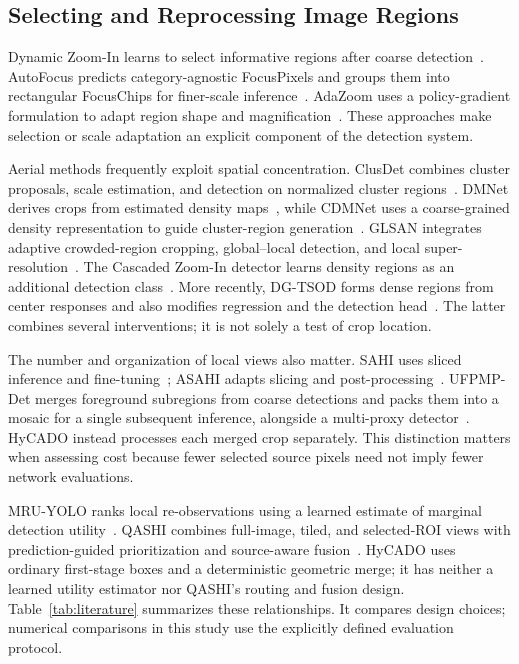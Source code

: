 \documentclass[journal]{IEEEtran}
\begin{document}
\subsection{Selecting and Reprocessing Image Regions}
Dynamic Zoom-In learns to select informative regions after coarse detection~\cite{gao2018dynamic}. AutoFocus predicts category-agnostic FocusPixels and groups them into rectangular FocusChips for finer-scale inference~\cite{najibi2019autofocus}. AdaZoom uses a policy-gradient formulation to adapt region shape and magnification~\cite{xujingtao2021adazoom}. These approaches make selection or scale adaptation an explicit component of the detection system.

Aerial methods frequently exploit spatial concentration. ClusDet combines cluster proposals, scale estimation, and detection on normalized cluster regions~\cite{yang2019clusdet}. DMNet derives crops from estimated density maps~\cite{li2020dmnet}, while CDMNet uses a coarse-grained density representation to guide cluster-region generation~\cite{duan2021cdmnet}. GLSAN integrates adaptive crowded-region cropping, global--local detection, and local super-resolution~\cite{deng2021glsan}. The Cascaded Zoom-In detector learns density regions as an additional detection class~\cite{meethal2023cz}. More recently, DG-TSOD forms dense regions from center responses and also modifies regression and the detection head~\cite{xie2026dgtsod}. The latter combines several interventions; it is not solely a test of crop location.

The number and organization of local views also matter. SAHI uses sliced inference and fine-tuning~\cite{akyon2022sahi}; ASAHI adapts slicing and post-processing~\cite{zhang2023asahi}. UFPMP-Det merges foreground subregions from coarse detections and packs them into a mosaic for a single subsequent inference, alongside a multi-proxy detector~\cite{huang2022ufpmp}. HyCADO instead processes each merged crop separately. This distinction matters when assessing cost because fewer selected source pixels need not imply fewer network evaluations.

MRU-YOLO ranks local re-observations using a learned estimate of marginal detection utility~\cite{chen2026mru}. QASHI combines full-image, tiled, and selected-ROI views with prediction-guided prioritization and source-aware fusion~\cite{tang2026qashi}. HyCADO uses ordinary first-stage boxes and a deterministic geometric merge; it has neither a learned utility estimator nor QASHI's routing and fusion design. Table~\ref{tab:literature} summarizes these relationships. It compares design choices; numerical comparisons in this study use the explicitly defined evaluation protocol.
\end{document}
